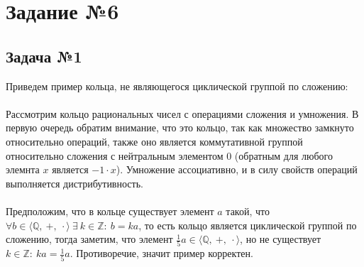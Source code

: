 \documentclass[a4paper,14pt]{article} %
\begin{document}
\section{Задание №6}
\subsection{Задача №1}
Приведем пример кольца, не являющегося циклической группой по сложению: \\\\
Рассмотрим кольцо рациональных чисел с операциями сложения и умножения. В первую очередь обратим внимание, что это кольцо, так как множество замкнуто относительно операций, также оно является коммутативной группой относительно сложения с нейтральным элементом $0$ (обратным для любого элемнта $x$ является $-1\cdot x$). Умножение ассоциативно, и в силу свойств операций выполняется дистрибутивность.\\\\
Предположим, что в кольце существует элемент $a$ такой, что $\forall b \in \langle \mathbb{Q,~+,~\cdot} \rangle~\exists~k \in \mathbb{Z}:~b = ka$, то есть кольцо является циклической группой по сложению, тогда заметим, что элемент $\frac{1}{5}a \in \langle \mathbb{Q,~+,~\cdot} \rangle$, но не существует $k \in \mathbb{Z}:~ka = \frac{1}{5}a$. Противоречие, значит пример корректен. 
\end{document}
